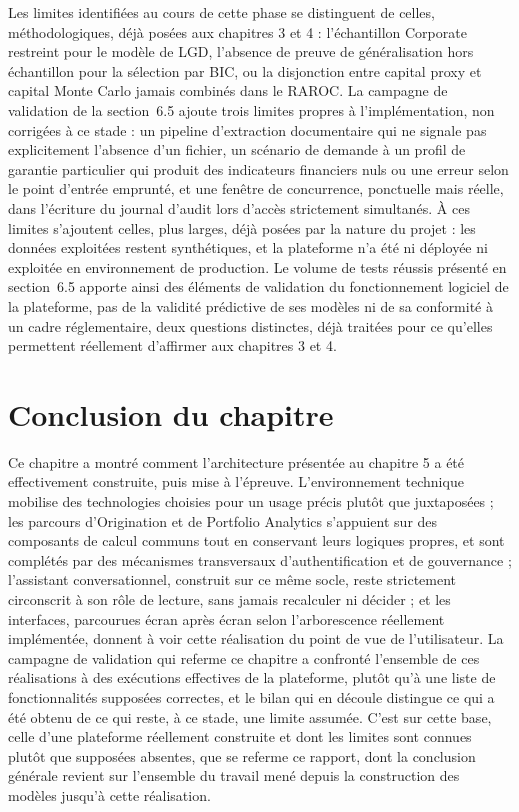 Les limites identifiées au cours de cette phase se distinguent de celles, méthodologiques, déjà posées aux chapitres 3 et 4 : l'échantillon Corporate restreint pour le modèle de LGD, l'absence de preuve de généralisation hors échantillon pour la sélection par BIC, ou la disjonction entre capital proxy et capital Monte Carlo jamais combinés dans le RAROC. La campagne de validation de la section~6.5 ajoute trois limites propres à l'implémentation, non corrigées à ce stade : un pipeline d'extraction documentaire qui ne signale pas explicitement l'absence d'un fichier, un scénario de demande à un profil de garantie particulier qui produit des indicateurs financiers nuls ou une erreur selon le point d'entrée emprunté, et une fenêtre de concurrence, ponctuelle mais réelle, dans l'écriture du journal d'audit lors d'accès strictement simultanés. À ces limites s'ajoutent celles, plus larges, déjà posées par la nature du projet : les données exploitées restent synthétiques, et la plateforme n'a été ni déployée ni exploitée en environnement de production. Le volume de tests réussis présenté en section~6.5 apporte ainsi des éléments de validation du fonctionnement logiciel de la plateforme, pas de la validité prédictive de ses modèles ni de sa conformité à un cadre réglementaire, deux questions distinctes, déjà traitées pour ce qu'elles permettent réellement d'affirmer aux chapitres 3 et 4.

\section*{Conclusion du chapitre}

Ce chapitre a montré comment l'architecture présentée au chapitre 5 a été effectivement construite, puis mise à l'épreuve. L'environnement technique mobilise des technologies choisies pour un usage précis plutôt que juxtaposées ; les parcours d'Origination et de Portfolio Analytics s'appuient sur des composants de calcul communs tout en conservant leurs logiques propres, et sont complétés par des mécanismes transversaux d'authentification et de gouvernance ; l'assistant conversationnel, construit sur ce même socle, reste strictement circonscrit à son rôle de lecture, sans jamais recalculer ni décider ; et les interfaces, parcourues écran après écran selon l'arborescence réellement implémentée, donnent à voir cette réalisation du point de vue de l'utilisateur. La campagne de validation qui referme ce chapitre a confronté l'ensemble de ces réalisations à des exécutions effectives de la plateforme, plutôt qu'à une liste de fonctionnalités supposées correctes, et le bilan qui en découle distingue ce qui a été obtenu de ce qui reste, à ce stade, une limite assumée. C'est sur cette base, celle d'une plateforme réellement construite et dont les limites sont connues plutôt que supposées absentes, que se referme ce rapport, dont la conclusion générale revient sur l'ensemble du travail mené depuis la construction des modèles jusqu'à cette réalisation.
